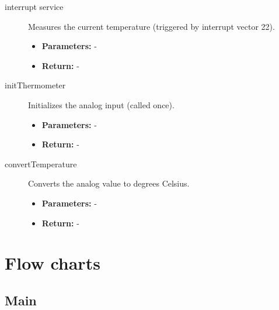 \documentclass[a4paper,12pt]{article}
\begin{document}
\begin{description}
    \item[interrupt service] Measures the current temperature (triggered by interrupt vector 22).
    \begin{itemize}
        \item \textbf{Parameters:} -
        \item \textbf{Return:} -
    \end{itemize}
    
    \item[initThermometer] Initializes the analog input (called once).
    \begin{itemize}
        \item \textbf{Parameters:} -
        \item \textbf{Return:} -
    \end{itemize}
    
    \item[convertTemperature] Converts the analog value to degrees Celsius.
    \begin{itemize}
        \item \textbf{Parameters:} -
        \item \textbf{Return:} -
    \end{itemize}
\end{description}
\newpage
\section{Flow charts}
\subsection{Main}
\end{document}
